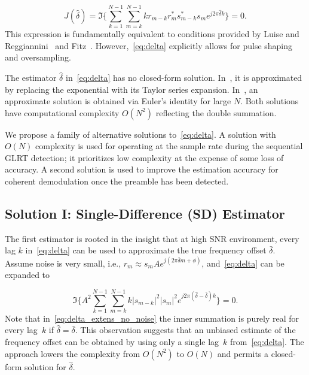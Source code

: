\begin{equation}
    \label{eq:delta}
    J(\hat{\delta}) = \Im\bigg\{\sum_{k=1}^{N-1}{\sum_{m=k}^{N-1}{kr_{m-k}r_m^{*}s_{m-k}^{*}s_m}e^{j2\pi\hat{\delta}k}}\bigg\}=0.
    \end{equation}
This expression is fundamentally equivalent to conditions provided by Luise and Reggiannini~\cite{Luise_Reggiannini_95} and Fitz~\cite{Fitz_94}.
However,~\eqref{eq:delta} explicitly allows for pulse shaping and oversampling.

The estimator $\hat{\delta}$ in~\eqref{eq:delta} has no closed-form
solution.
In~\cite{Luise_Reggiannini_95}, it is approximated by replacing the exponential with its
Taylor series expansion.
In~\cite{Fitz_94}, an approximate solution is obtained via Euler's
identity for large $N$.
Both solutions have computational complexity $O(N^2)$ reflecting the
double summation.

We propose a family of alternative solutions to~\eqref{eq:delta}.
A solution with $O(N)$ complexity is used for operating at the sample
rate during the sequential GLRT detection;
it prioritizes low complexity at the expense of some loss of accuracy.
A second solution is used to improve the estimation accuracy for coherent demodulation once the preamble has been detected.

\subsection{Solution I: Single-Difference (SD) Estimator}

The first estimator is rooted in the insight that at high SNR environment, every lag $k$ in~\eqref{eq:delta} can be used to
approximate the true frequency offset $\bar{\delta}$. Assume noise is very small, i.e.,
$r_m \approx s_mAe^{j(2\pi \bar{\delta} m+\phi)}$, and~\eqref{eq:delta} can be expanded to

\begin{equation}
    \label{eq:delta_extens_no_noise}
    \Im\bigg\{A^2\sum_{k=1}^{N-1}\sum_{m=k}^{N-1}k|s_{m-k}|^2|s_m|^2e^{j2\pi (\hat{\delta}-\bar{\delta})k}\bigg\}=0.
    \end{equation}
Note that in~\eqref{eq:delta_extens_no_noise} the inner summation is purely real for every lag~$k$ if $\hat{\delta}=\bar{\delta}$.
This observation suggests that an unbiased estimate of the frequency offset can be obtained by using only a single lag~$k$
from~\eqref{eq:delta}. The approach lowers the complexity from $O(N^2)$ to $O(N)$ and permits a closed-form solution for $\hat{\delta}$.  

